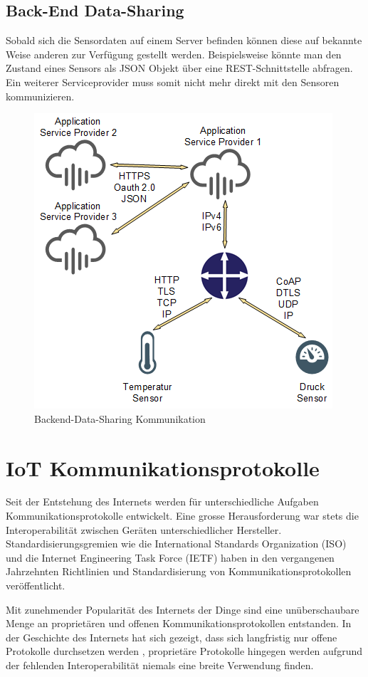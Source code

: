 \subsection{Back-End Data-Sharing}
Sobald sich die Sensordaten auf einem Server befinden können diese auf bekannte Weise anderen zur Verfügung gestellt werden. Beispielsweise könnte man den Zustand eines Sensors als JSON Objekt über eine REST-Schnittstelle abfragen. Ein weiterer Serviceprovider muss somit nicht mehr direkt mit den Sensoren kommunizieren.
\begin{figure}[H]
\centering
\includegraphics[scale=0.8]{images/backend-data-sharing.png}
\caption{Backend-Data-Sharing Kommunikation}
\end{figure}

\newpage

\section{IoT Kommunikationsprotokolle}
Seit der Entstehung des Internets werden für unterschiedliche Aufgaben Kommunikationsprotokolle entwickelt. Eine grosse Herausforderung war stets die Interoperabilität zwischen Geräten unterschiedlicher Hersteller. Standardisierungsgremien wie die International Standards Organization (ISO) und die Internet Engineering Task Force (IETF) haben in den vergangenen Jahrzehnten Richtlinien und Standardisierung von Kommunikationsprotokollen veröffentlicht. 

Mit zunehmender Popularität des Internets der Dinge sind eine unüberschaubare Menge an proprietären und offenen Kommunikationsprotokollen entstanden. In der Geschichte des Internets hat sich gezeigt, dass sich langfristig nur offene Protokolle durchsetzen werden \cite{Obermaier14}, proprietäre Protokolle hingegen werden aufgrund der fehlenden Interoperabilität niemals eine breite Verwendung finden.
